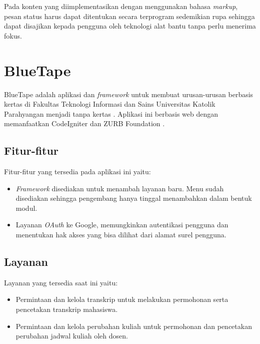 Pada konten yang diimplementasikan dengan menggunakan bahasa \textit{markup}, pesan status harus dapat ditentukan secara terprogram sedemikian rupa sehingga dapat disajikan kepada pengguna oleh teknologi alat bantu tanpa perlu menerima fokus.



\section{BlueTape}
\label{sec:bluetape}
BlueTape adalah aplikasi dan \textit{framework} untuk membuat urusan-urusan berbasis kertas di Fakultas Teknologi Informasi dan Sains Universitas Katolik Parahyangan menjadi tanpa kertas \cite{BlueTape}. Aplikasi ini berbasis web dengan memanfaatkan CodeIgniter \cite{CodeIgniter} dan ZURB Foundation \cite{Foundation}.

\subsection{Fitur-fitur}
\label{sec:bluetape_fitur}
Fitur-fitur yang tersedia pada aplikasi ini yaitu:
\begin{itemize}
	\item \textit{Framework} disediakan untuk menambah layanan baru. Menu sudah disediakan sehingga pengembang hanya tinggal menambahkan dalam bentuk modul.
	\item Layanan \textit{OAuth} ke Google, memungkinkan autentikasi pengguna dan menentukan hak akses yang bisa dilihat dari alamat surel pengguna.
\end{itemize}

\subsection{Layanan}
\label{sec:bluetape_layanan}
Layanan yang tersedia saat ini yaitu:
\begin{itemize}
	\item Permintaan dan kelola transkrip untuk melakukan permohonan serta pencetakan transkrip mahasiswa.
	\item Permintaan dan kelola perubahan kuliah untuk permohonan dan pencetakan perubahan jadwal kuliah oleh dosen.
\end{itemize}

